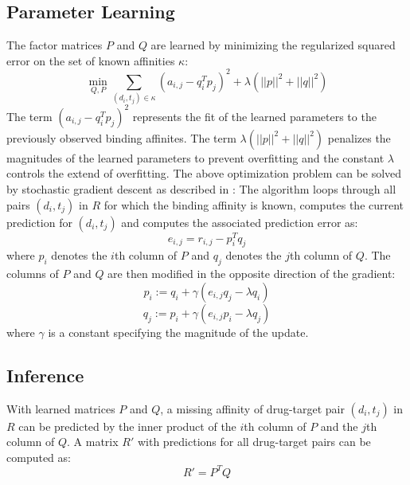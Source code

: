 \subsection{Parameter Learning}

The factor matrices $P$ and $Q$ are learned by minimizing the regularized squared error on the set of known affinities $\kappa$:
\begin{equation}
\min\limits_{Q,P}{\sum\limits_{(d_i,t_j)\in \kappa} (a_{i,j}-q_i^Tp_j)^2} + \lambda (||p||^2 + ||q||^2)
\end{equation}
The term $(a_{i,j}-q_i^Tp_j)^2$ represents the fit of the learned parameters to the previously observed binding affinites. The term $\lambda (||p||^2 + ||q||^2)$ penalizes the magnitudes of the learned parameters to prevent overfitting and the constant $\lambda$ controls the extend of overfitting.
The above optimization problem can be solved by stochastic gradient descent as described in \cite{Koren:2009:MFT:1608565.1608614}:
The algorithm loops through all pairs $(d_i, t_j)$ in $R$ for which the binding affinity is known, computes the current prediction for $(d_i, t_j)$ and computes the associated prediction error as:
\begin{equation}
e_{i,j} = r_{i,j} - p_i^Tq_j
\end{equation}
where $p_i$ denotes the $i$th column of $P$ and $q_j$ denotes the $j$th column of $Q$. The columns of $P$ and $Q$ are then modified in the opposite direction of the gradient:
\begin{equation}
p_i:= q_i + \gamma (e_{i,j} q_j - \lambda q_i)
\end{equation}
\begin{equation}
q_j:=p_i + \gamma (e_{i,j} p_i - \lambda q_j)
\end{equation}
where $\gamma$ is a constant specifying the magnitude of the update.

\subsection{Inference}

With learned matrices $P$ and $Q$, a missing affinity of drug-target pair $(d_i, t_j)$ in $R$ can be predicted by the inner product of the $i$th column of $P$ and the $j$th column of $Q$. A matrix $R'$ with predictions for all drug-target pairs can be computed as:
\begin{equation}
R' = P^TQ
\end{equation}

